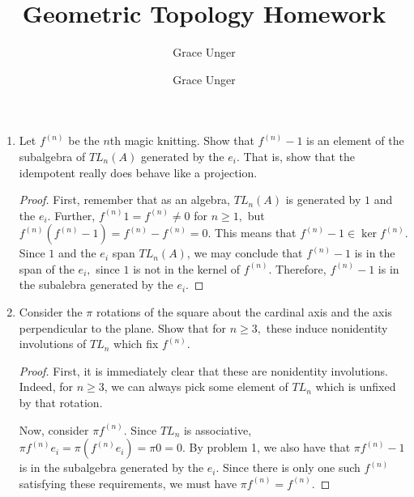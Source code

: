 \documentclass{article}
\author{Grace Unger}
\author{Grace Unger}
\title{Geometric Topology Homework}
\begin{document}
\maketitle

\begin{enumerate}
    \item Let $f^{(n)}$ be the $n$th magic knitting. Show that $f^{(n)}-1$ is an element of the subalgebra of $TL_n(A)$ generated by the $e_i.$ That is, show that the idempotent really does behave like a projection.
    \begin{proof}
        First, remember that as an algebra, $TL_n(A)$ is generated by $1$ and the $e_i$. Further, $f^{(n)}1 = f^{(n)} \neq 0$ for $n\ge 1,$ but $f^{(n)}(f^{(n)}-1) = f^{(n)}-f^{(n)} = 0.$ This means that $f^{(n)}-1\in \ker f^{(n)}.$ Since $1$ and the $e_i$ span $TL_n(A)$, we may conclude that $f^{(n)}-1$ is in the span of the $e_i,$ since $1$ is not in the kernel of $f^{(n)}.$ Therefore, $f^{(n)}-1$ is in the subalebra generated by the $e_i.$
      \end{proof}
    \item Consider the $\pi$ rotations of the square about the cardinal axis and the axis perpendicular to the plane. Show that for $n\ge 3,$ these induce nonidentity involutions of $TL_n$ which fix $f^{(n)}.$
    \begin{proof}
      First, it is immediately clear that these are nonidentity involutions. Indeed, for $n\ge 3$, we can always pick some element of $TL_n$ which is unfixed by that rotation.
      
      Now, consider $\pi f^{(n)}.$ Since $TL_n$ is associative, $\pi f^{(n)}e_i = \pi(f^{(n)}e_i) = \pi 0 = 0.$ By problem 1, we also have that $\pi f^{(n)}-1$ is in the subalgebra generated by the $e_i.$ Since there is only one such $f^{(n)}$ satisfying these requirements, we must have $\pi f^{(n)} = f^{(n)}.$
    \end{proof}


\end{enumerate}
\end{document}
